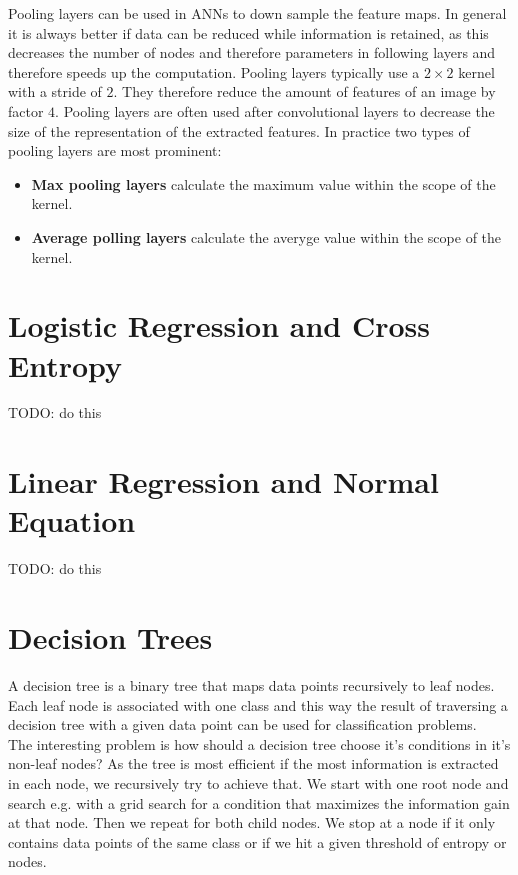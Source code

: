 Pooling layers can be used in ANNs to down sample the feature maps. In general it is always better if data can be reduced while information is retained, as this decreases the number of nodes and therefore parameters in following layers and therefore speeds up the computation. Pooling layers typically use a $2 \times 2$ kernel with a stride of $2$. They therefore reduce the amount of features of an image by factor $4$. Pooling layers are often used after convolutional layers to decrease the size of the representation of the extracted features. In practice two types of pooling layers are most prominent:

\begin{itemize}
    \item \textbf{Max pooling layers} calculate the maximum value within the scope of the kernel.
    \item \textbf{Average polling layers} calculate the averyge value within the scope of the kernel.
\end{itemize}

\section{Logistic Regression and Cross Entropy}

TODO: do this


\section{Linear Regression and Normal Equation}

TODO: do this


\section{Decision Trees}

A decision tree is a binary tree that maps data points recursively to leaf nodes. Each leaf node is associated with one class and this way the result of traversing a decision tree with a given data point can be used for classification problems.\\
The interesting problem is how should a decision tree choose it's conditions in it's non-leaf nodes? As the tree is most efficient if the most information is extracted in each node, we recursively try to achieve that. We start with one root node and search e.g. with a grid search for a condition that maximizes the information gain at that node. Then we repeat for both child nodes. We stop at a node if it only contains data points of the same class or if we hit a given threshold of entropy or nodes.\\

